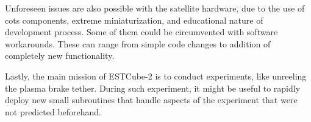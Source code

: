 Unforeseen issues are also possible with the satellite hardware, due to the use of \gls{cots} components, extreme miniaturization, and educational nature of development process. Some of them could be circumvented with software workarounds. These can range from simple code changes to addition of completely new functionality.

Lastly, the main mission of ESTCube-2 is to conduct experiments, like unreeling the plasma brake tether. During such experiment, it might be useful to rapidly deploy new small subroutines that handle aspects of the experiment that were not predicted beforehand.